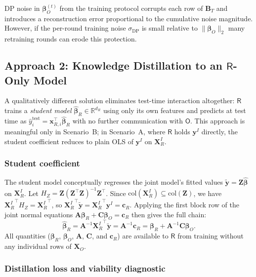 \documentclass[12pt]{article}
\theoremstyle{definition}
\theoremstyle{plain}
\newcommand{\bXO}{\mathbf{X}_{O}}
\newcommand{\bXRI}{\mathbf{X}_{R}^{I}}
\newcommand{\bZ}{\mathbf{Z}}
\newcommand{\by}{\mathbf{y}}
\newcommand{\bbeta}{\boldsymbol{\beta}}
\newcommand{\bA}{\mathbf{A}}
\newcommand{\bC}{\mathbf{C}}
\newcommand{\bcR}{\mathbf{c}_{R}}
\newcommand{\Party}[1]{\textsf{#1}}
\begin{document}
DP noise in $\bbeta_{O}^{(t)}$ from the training protocol corrupts each
row of $\mathbf{B}_{T}$ and introduces a reconstruction error proportional
to the cumulative noise magnitude. However, if the per-round training noise
$\sigma_{\mathrm{DP}}$ is small relative to $\|\bbeta_{O}\|_{2}$ many retraining
rounds can erode this protection.

\subsection{Approach 2: Knowledge Distillation to an $\Party{R}$-Only Model}
\label{sec:inf:distill}

A qualitatively different solution eliminates test-time interaction
altogether: $\Party{R}$ trains a \emph{student model} $\hat{\bbeta}_{R}
\in \mathbb{R}^{d_R}$ using only its own features and predicts at test time
as $\hat{y}_{i}^{\mathrm{test}} = \mathbf{x}_{R,i}^{\top}\hat{\bbeta}_{R}$
with no further communication with $\Party{O}$. This approach is
meaningful only in Scenario~B; in Scenario~A, where $\Party{R}$ holds
$\by^{I}$ directly, the student coefficient reduces to plain OLS of
$\by^{I}$ on $\bXRI$.

\subsubsection*{Student coefficient}

The student model conceptually regresses the joint model's fitted values
$\tilde{\mathbf{y}} = \bZ\hat{\bbeta}$ on $\bXRI$. Let 
$H_{Z} = \bZ(\bZ^{\top}\bZ)^{-1}\bZ^{\top}$.  
Since
$\mathrm{col}(\bXRI) \subseteq \mathrm{col}(\bZ)$, we have
${\bXRI}^{\top}H_{Z} = {\bXRI}^{\top}$, so
${\bXRI}^{\top}\tilde{\mathbf{y}} = {\bXRI}^{\top}\by^{I} = \bcR$.
Applying the first block row of the joint normal equations
$\bA\bbeta_{R} + \bC\bbeta_{O} = \bcR$ then gives the full chain:
\begin{equation}
  \hat{\bbeta}_{R}
  = \bA^{-1}{\bXRI}^{\top}\tilde{\mathbf{y}}
  = \bA^{-1}\bcR
  = \bbeta_{R} + \bA^{-1}\bC\bbeta_{O}.
  \label{eq:studentcoef}
\end{equation}
All quantities ($\bbeta_{R}$, $\bbeta_{O}$, $\bA$, $\bC$, and $\bcR$) are available to $\Party{R}$ from training without any individual
rows of $\bXO$.

\subsubsection*{Distillation loss and viability diagnostic}
\end{document}
